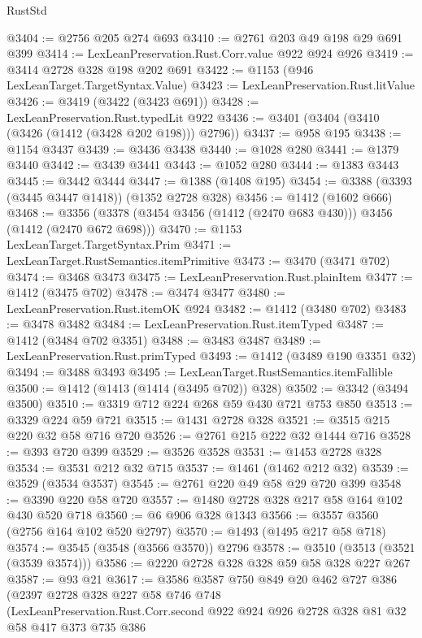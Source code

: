 \begin{lexlean}{RustStd}
\begin{coremodule}
{\begin{coremodule}
{{{{{{{{{{@3404 := @2756 @205 @274 @693
@3410 := @2761 @203 @49 @198 @29 @691 @399
@3414 := LexLeanPreservation.Rust.Corr.value @922 @924 @926
@3419 := @3414 @2728 @328 @198 @202 @691
@3422 := @1153 (@946 LexLeanTarget.TargetSyntax.Value)
@3423 := LexLeanPreservation.Rust.litValue
@3426 := @3419 (@3422 (@3423 @691))
@3428 := LexLeanPreservation.Rust.typedLit @922
@3436 := @3401 (@3404 (@3410 (@3426 (@1412 (@3428 @202 @198))) @2796))
@3437 := @958 @195
@3438 := @1154 @3437
@3439 := @3436 @3438
@3440 := @1028 @280
@3441 := @1379 @3440
@3442 := @3439 @3441
@3443 := @1052 @280
@3444 := @1383 @3443
@3445 := @3442 @3444
@3447 := @1388 (@1408 @195)
@3454 := @3388 (@3393 (@3445 @3447 @1418)) (@1352 @2728 @328)
@3456 := @1412 (@1602 @666)
@3468 := @3356 (@3378 (@3454 @3456 (@1412 (@2470 @683 @430))) @3456 (@1412 (@2470 @672 @698)))
@3470 := @1153 LexLeanTarget.TargetSyntax.Prim
@3471 := LexLeanTarget.RustSemantics.itemPrimitive
@3473 := @3470 (@3471 @702)
@3474 := @3468 @3473
@3475 := LexLeanPreservation.Rust.plainItem
@3477 := @1412 (@3475 @702)
@3478 := @3474 @3477
@3480 := LexLeanPreservation.Rust.itemOK @924
@3482 := @1412 (@3480 @702)
@3483 := @3478 @3482
@3484 := LexLeanPreservation.Rust.itemTyped
@3487 := @1412 (@3484 @702 @3351)
@3488 := @3483 @3487
@3489 := LexLeanPreservation.Rust.primTyped
@3493 := @1412 (@3489 @190 @3351 @32)
@3494 := @3488 @3493
@3495 := LexLeanTarget.RustSemantics.itemFallible
@3500 := @1412 (@1413 (@1414 (@3495 @702)) @328)
@3502 := @3342 (@3494 @3500)
@3510 := @3319 @712 @224 @268 @59 @430 @721 @753 @850
@3513 := @3329 @224 @59 @721
@3515 := @1431 @2728 @328
@3521 := @3515 @215 @220 @32 @58 @716 @720
@3526 := @2761 @215 @222 @32 @1444 @716
@3528 := @393 @720 @399
@3529 := @3526 @3528
@3531 := @1453 @2728 @328
@3534 := @3531 @212 @32 @715
@3537 := @1461 (@1462 @212 @32)
@3539 := @3529 (@3534 @3537)
@3545 := @2761 @220 @49 @58 @29 @720 @399
@3548 := @3390 @220 @58 @720
@3557 := @1480 @2728 @328 @217 @58 @164 @102 @430 @520 @718
@3560 := @6 @906 @328 @1343
@3566 := @3557 @3560 (@2756 @164 @102 @520 @2797)
@3570 := @1493 (@1495 @217 @58 @718)
@3574 := @3545 (@3548 (@3566 @3570)) @2796
@3578 := @3510 (@3513 (@3521 (@3539 @3574)))
@3586 := @2220 @2728 @328 @328 @59 @58 @328 @227 @267
@3587 := @93 @21
@3617 := @3586
    @3587
    @750
    @849
    @20
    @462
    @727
    @386
    (@2397
      @2728
      @328
      @227
      @58
      @746
      @748
      (LexLeanPreservation.Rust.Corr.second
        @922
        @924
        @926
        @2728
        @328
        @81
        @32
        @58
        @417
        @373
        @735
        @386
}}}}}}}}}}
\end{coremodule}}
\end{coremodule}
\end{lexlean}
